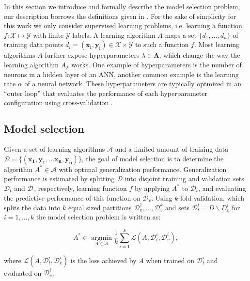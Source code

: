\documentclass[journal]{IEEEtran}
\begin{document}
In this section we introduce and formally describe the model selection problem, our description borrows the definitions given in \cite{Thornton2013}. For the sake of simplicity for this work we only consider supervised learning problems, i.e. learning a function $f: \mathcal{X} \mapsto \mathcal{Y}$ with finite $\mathcal{Y}$ labels. A learning algorithm $A$ maps a set $\{d_1, \ldots, d_n\}$ of training data points $d_i = (\mathbf{x_i}, \mathbf{y_i}) \in \mathcal{X} \times \mathcal{Y}$ to such a function $f$. Most learning algorithms $A$ further expose hyperparameters $\lambda \in \mathbf{\Lambda}$, which change the way the learning algorithm $A_{\lambda}$ works. One example of hyperparameters is the number of neurons in a hidden layer of an ANN, another common example is the learning rate $\alpha$ of a neural network. These hyperparameters are typically optmized in an ``outer loop'' that evaluates the performance of each hyperparameter configuration using cross-validation \cite{alpaydin2010}.

\subsection{Model selection}

Given a set of learning algorithms $\mathcal{A}$ and a limited amount of training data $\mathcal{D} = \{ (\mathbf{x_1}, \mathbf{y_1}, \ldots \mathbf{x_n}, \mathbf{y_n}) \}$, the goal of model selection is to determine the algorithm $A^* \in \mathcal{A}$ with optimal generalization performance. Generalization performance is estimated by splitting $\mathcal{D}$ into disjoint training and validation sets $\mathcal{D}_{t}$ and $\mathcal{D}_{v}$ respectively, learning function $f$ by applying $A^*$ to $\mathcal{D}_{t}$, and evaluating the predictive performance of this function on $\mathcal{D}_{v}$. Using $k$-fold validation, which splits the data into $k$ equal sized partitions $ \mathcal{D}^{1}_{v}, \ldots,  \mathcal{D}^{k}_{v}$ and sets $ \mathcal{D}^{i}_{t} =  D \backslash D^{i}_{v}$ for $i = 1, \ldots, k$ the model selection problem is written as:

\begin{equation}
A^* \in \underset{A \in \mathcal{A}}{\operatorname{argmin}} \frac{1}{k} \sum_{i=1}^{k} \mathcal{L} \left( A, \mathcal{D}^{i}_{t},  \mathcal{D}^{i}_{v} \right),
\end{equation}

where $ \mathcal{L} \left( A, \mathcal{D}^{i}_{t},  \mathcal{D}^{i}_{v} \right) $ is the loss achieved by $A$ when trained on $\mathcal{D}^{i}_{t}$ and evaluated on $\mathcal{D}^{i}_{v}$. 
\end{document}
